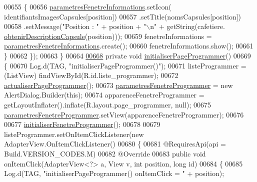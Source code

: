 \begin{DoxyCode}
00655             \{
00656                 \hyperlink{classcom_1_1example_1_1ekawa_1_1_ihm_a610b25d0bf8b26fbf1ed24345acef189}{parametresFenetreInformations}.setIcon(
      identifiantsImagesCapsules[position])
00657                         .setTitle(nomsCapsules[position])
00658                         .setMessage(\textcolor{stringliteral}{"Position : "} + position + \textcolor{stringliteral}{"\(\backslash\)n"} + getString(cafetiere.
      \hyperlink{classcom_1_1example_1_1ekawa_1_1_cafetiere_ac9ff316ec5e971d52f595dc4594e7b5b}{obtenirDescriptionCapsule}(position)));
00659                 fenetreInformations = \hyperlink{classcom_1_1example_1_1ekawa_1_1_ihm_a610b25d0bf8b26fbf1ed24345acef189}{parametresFenetreInformations}.create();
00660                 fenetreInformations.show();
00661             \}
00662         \});
00663     \}
00664 
\hyperlink{classcom_1_1example_1_1ekawa_1_1_ihm_aa5ef2c0c4b4cefb518ec4f3e05b098aa}{00668}     \textcolor{keyword}{private} \textcolor{keywordtype}{void} \hyperlink{classcom_1_1example_1_1ekawa_1_1_ihm_aa5ef2c0c4b4cefb518ec4f3e05b098aa}{initialiserPageProgrammer}()
00669     \{
00670         Log.d(TAG, \textcolor{stringliteral}{"initialiserPageProgrammer()"});
00671         listeProgrammer = (ListView) findViewById(R.id.liste\_programmer);
00672         \hyperlink{classcom_1_1example_1_1ekawa_1_1_ihm_adbeeac61b5a53c52d21da490659de983}{actualiserPageProgrammer}();
00673         \hyperlink{classcom_1_1example_1_1ekawa_1_1_ihm_a6eb2afb2fe8da7f3a749089c84934145}{parametresFenetreProgrammer} = \textcolor{keyword}{new} AlertDialog.Builder(\textcolor{keyword}{this});
00674         apparenceFenetreProgrammer = getLayoutInflater().inflate(R.layout.page\_programmer, null);
00675         \hyperlink{classcom_1_1example_1_1ekawa_1_1_ihm_a6eb2afb2fe8da7f3a749089c84934145}{parametresFenetreProgrammer}.setView(apparenceFenetreProgrammer);
00676 
00677         \hyperlink{classcom_1_1example_1_1ekawa_1_1_ihm_a08b1da8fdc68effff9a6da918e14d12d}{initialiserFenetreProgrammer}();
00678 
00679         listeProgrammer.setOnItemClickListener(\textcolor{keyword}{new} AdapterView.OnItemClickListener()
00680         \{
00681             @RequiresApi(api = Build.VERSION\_CODES.M)
00682             @Override
00683             \textcolor{keyword}{public} \textcolor{keywordtype}{void} onItemClick(AdapterView<?> a, View v, \textcolor{keywordtype}{int} position, \textcolor{keywordtype}{long} \textcolor{keywordtype}{id})
00684             \{
00685                 Log.d(TAG, \textcolor{stringliteral}{"initialiserPageProgrammer() onItemClick = "} + position);

\end{DoxyCode}
